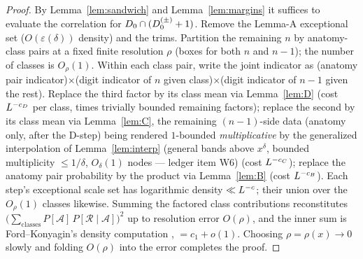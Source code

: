 \begin{proof}
By Lemma~\ref{lem:sandwich} and Lemma~\ref{lem:margins} it suffices to
evaluate the correlation for $D_0\cap(D_0^{(\pm)}+1)$. Remove the
Lemma-A exceptional set ($O(\varepsilon(\delta))$ density) and the
trims. Partition the remaining $n$ by anatomy-class pairs at a fixed
finite resolution $\rho$ (boxes for both $n$ and $n-1$); the number of
classes is $O_\rho(1)$. Within each class pair, write the joint
indicator as (anatomy pair indicator)$\times$(digit indicator of $n$
given class)$\times$(digit indicator of $n-1$ given the rest). Replace
the third factor by its class mean via Lemma~\ref{lem:D} (cost
$L^{-c_D}$ per class, times trivially bounded remaining factors);
replace the second by its class mean via Lemma~\ref{lem:C}, the
remaining $(n-1)$-side data (anatomy only, after the D-step) being
rendered $1$-bounded \emph{multiplicative} by the generalized
interpolation of Lemma~\ref{lem:interp} (general bands above
$x^{\delta}$, bounded multiplicity $\le1/\delta$, $O_{\delta}(1)$
nodes --- ledger item W6) (cost $L^{-c_C}$); replace the anatomy pair probability by the product
via Lemma~\ref{lem:B} (cost $L^{-c_B}$). Each step's exceptional
scale set has logarithmic density $\ll L^{-c}$; their union over
the $O_\rho(1)$ classes likewise. Summing the factored class
contributions reconstitutes
$\big(\sum_{\text{classes}}P[\mathcal A]\,P[\mathcal R\mid\mathcal
A]\big)^{2}$ up to resolution error $O(\rho)$, and the inner sum is
Ford--Konyagin's density computation \cite{FK21}, $=c_1+o(1)$.
Choosing $\rho=\rho(x)\to0$ slowly and folding $O(\rho)$ into the
error completes the proof.
\end{proof}
